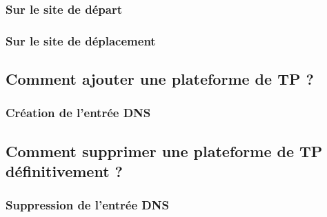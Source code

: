 \documentclass[a4paper]{article}
\begin{document}
\subsubsection{Sur le site de départ}

\subsubsection{Sur le site de déplacement}

\subsection{Comment ajouter une plateforme de TP  ?}

\subsubsection{Création de l'entrée DNS}

\subsection{Comment supprimer une plateforme de TP définitivement ?}

\subsubsection{Suppression de l'entrée DNS}
\end{document}
